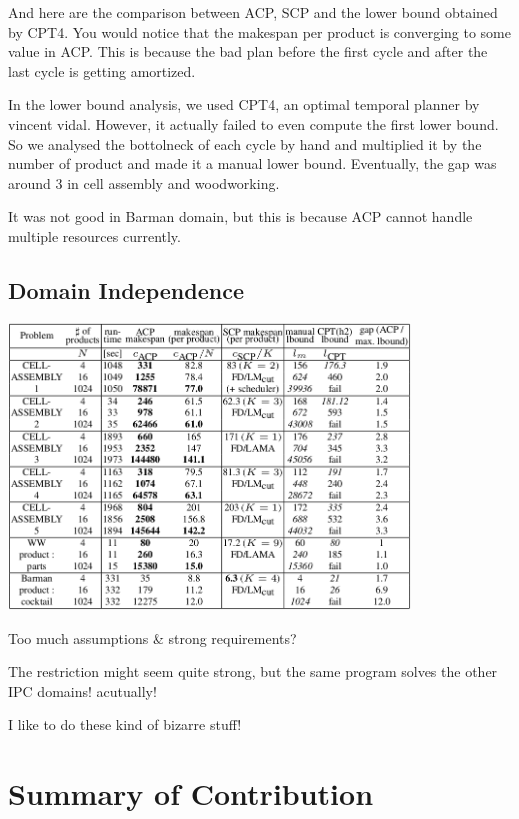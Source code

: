 \begin{resume}
And here are the comparison between
ACP, SCP and the lower bound obtained by CPT4.
You would notice that the makespan per product is converging to some value
in ACP. This is because the bad plan before the first cycle
and after the last cycle is getting amortized.

In the lower bound analysis, we used
CPT4, an optimal temporal planner by vincent vidal.
However, it actually failed to even compute the first lower bound.
So we analysed the bottolneck of each cycle by hand
and multiplied it by the number of product and made it a manual lower bound.
Eventually, the gap was around 3 in cell assembly and woodworking.

It was not good in Barman domain,
but this is because ACP cannot handle multiple resources currently.
\end{resume}

\subsection{Domain Independence}
\label{sec-9-5}
\includegraphics[width=0.8\textwidth]{img/static/results-poster.png}

Too much assumptions \& strong requirements?

\begin{resume}
The restriction might seem quite strong,
but the same program solves the other IPC domains! acutually!

I like to do these kind of bizarre stuff!
\end{resume}

\section{Summary of Contribution}
\label{sec-10}

